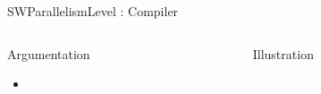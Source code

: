 \begin{Frame}{SWParallelismLevel : Compiler}
 \begin{columns}[t]
  \begin{column}{\BW}
    \begin{block}{Argumentation}
      \begin{itemize}
        \item
      \end{itemize}
    \end{block}
  \end{column}
  \begin{column}{\BW}
    \begin{block}{Illustration}
    \end{block}
  \end{column}

 \end{columns}
\end{Frame}
